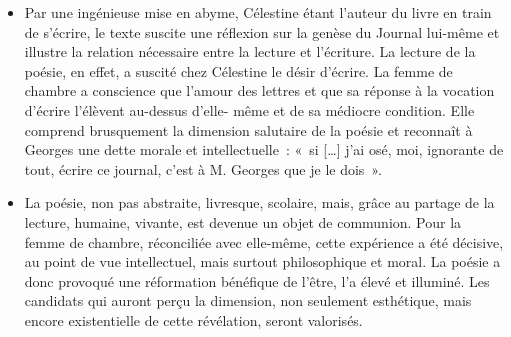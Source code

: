 {\begin{itemize}[label=\textbullet]
\item Par une ingénieuse mise en abyme, Célestine étant l'auteur du livre en train de
s'écrire, le texte suscite une réflexion sur la genèse du Journal lui-même et illustre la
relation nécessaire entre la lecture et l'écriture. La lecture de la poésie, en effet, a
suscité chez Célestine le désir d'écrire. La femme de chambre a conscience que
l'amour des lettres et que sa réponse à la vocation d'écrire l'élèvent au-dessus d'elle-
même et de sa médiocre condition. Elle comprend brusquement la dimension salutaire
de la poésie et reconnaît à Georges une dette morale et intellectuelle~: «~si […] j'ai osé,
moi, ignorante de tout, écrire ce journal, c'est à M. Georges que je le dois~».

\item La poésie, non pas abstraite, livresque, scolaire, mais, grâce au partage de la lecture,
humaine, vivante, est devenue un objet de communion. Pour la femme de chambre,
réconciliée avec elle-même, cette expérience a été décisive, au point de vue
intellectuel, mais surtout philosophique et moral. La poésie a donc provoqué une
réformation bénéfique de l'être, l'a élevé et illuminé. Les candidats qui auront perçu la
dimension, non seulement esthétique, mais encore existentielle de cette révélation,
seront valorisés.
\end{itemize}}%
